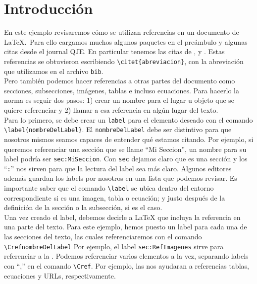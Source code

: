 \documentclass{article}
\begin{document}
\section{Introducción}

En este ejemplo revisaremos cómo se utilizan referencias en un documento de {\LaTeX}. Para ello cargamos muchos algunos paquetes en el preámbulo y algunas citas desde el journal QJE. En particular tenemos las citas de \citet{policeViolence}, \citet{religionAndEconomy} y \citet{crimesMorality}. Estas referencias se obtuvieron escribiendo \texttt{\textbackslash citet\{abreviacion\}}, con la abreviación que utilizamos en el archivo \texttt{bib}.	\\

Pero también podemos hacer referencias a otras partes del documento como secciones, subsecciones, imágenes, tablas e incluso ecuaciones. Para hacerlo la norma es seguir dos pasos: 1) crear un nombre para el lugar u objeto que se quiere referenciar y 2) llamar a esa referencia en algún lugar del texto.	\\

Para lo primero, se debe crear un \texttt{label} para el elemento deseado con el comando \texttt{\textbackslash label\{nombreDelLabel\}}. El \texttt{nombreDelLabel} debe ser distintivo para que nosotros mismos seamos capaces de entender qué estamos citando. Por ejemplo, si queremos referenciar una sección que se llame ``Mi Seccion'', un nombre para su label podría ser \texttt{sec:MiSeccion}. Con \texttt{sec} dejamos claro que es una sección y los ``\texttt{:}'' nos sirven para que la lectura del label sea más claro. Algunos editores además guardan los labels por nosotros en una lista que podemos revisar. Es importante saber que el comando \texttt{\textbackslash label} se ubica dentro del entorno correspondiente si es una imagen, tabla o ecuación; y justo después de la definición de la sección o la subsección, si es el caso.	\\

Una vez creado el label, debemos decirle a {\LaTeX} que incluya la referencia en una parte del texto. Para este ejemplo, hemos puesto un label para cada una de las secciones del texto, las cuales referenciaremos con el comando \texttt{\textbackslash Cref{nombreDelLabel}} Por ejemplo, el label \texttt{sec:RefImagenes} sirve para referenciar a la . Podemos referenciar varios elementos a la vez, separando labels con ``,'' en el comando \texttt{\textbackslash Cref}. Por ejemplo, las  nos ayudaran a referencias tablas, ecuaciones y URLs, respectivamente.
\end{document}
